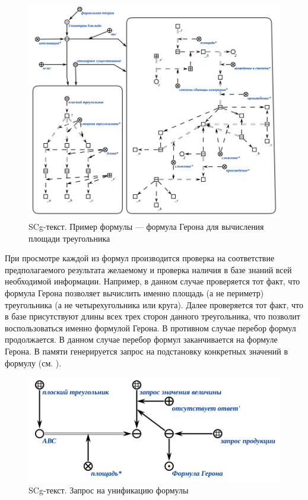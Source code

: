 \begin{figure}[H]
	\includegraphics[width=1\linewidth]{images/part7/chapter_learning_systems/formula-gerona-kbe.png}
	\caption{SCg-текст. Пример формулы --- формула Герона для вычисления площади треугольника}
	\label{fig:formula-gerona}
\end{figure}

При просмотре каждой из формул производится проверка на соответствие предполагаемого результата желаемому и проверка наличия в базе знаний всей необходимой информации. Например, в данном случае проверяется тот факт, что формула Герона позволяет вычислить именно площадь (а не периметр) треугольника (а не четырехугольника или круга). Далее проверяется тот факт, что в базе присутствуют длины всех трех сторон данного треугольника, что позволит воспользоваться именно формулой Герона. В противном случае перебор формул продолжается. В данном случае перебор формул заканчивается на формуле Герона. В памяти генерируется запрос на подстановку конкретных значений в формулу (см. ).

\begin{figure}[H]
	\includegraphics[scale=0.85]{images/part7/chapter_learning_systems/step3-kbe.png}
	\caption{SCg-текст. Запрос на унификацию формулы}
	\label{fig:step3}
\end{figure}

